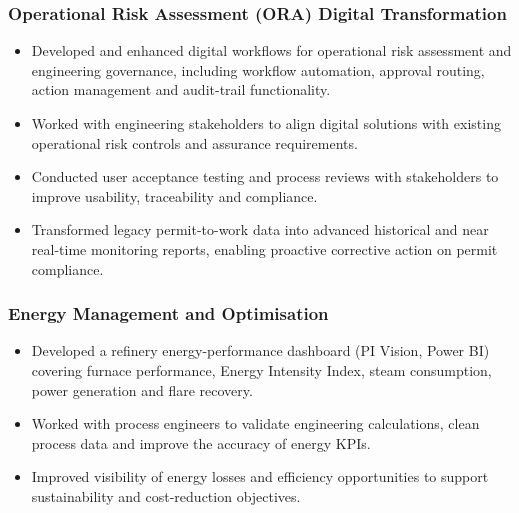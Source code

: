 \documentclass[11pt,a4paper]{article}
\begin{document}
\subsubsection*{Operational Risk Assessment (ORA) Digital Transformation}
\begin{itemize}
    \item Developed and enhanced digital workflows for operational risk
          assessment and engineering governance, including workflow
          automation, approval routing, action management and audit-trail
          functionality.
    \item Worked with engineering stakeholders to align digital solutions with
          existing operational risk controls and assurance requirements.
    \item Conducted user acceptance testing and process reviews with
          stakeholders to improve usability, traceability and compliance.
    \item Transformed legacy permit-to-work data into advanced historical and
          near real-time monitoring reports, enabling proactive corrective
          action on permit compliance.
\end{itemize}

\subsubsection*{Energy Management and Optimisation}
\begin{itemize}
    \item Developed a refinery energy-performance dashboard (PI Vision, Power
          BI) covering furnace performance, Energy Intensity Index, steam
          consumption, power generation and flare recovery.
    \item Worked with process engineers to validate engineering calculations,
          clean process data and improve the accuracy of energy KPIs.
    \item Improved visibility of energy losses and efficiency opportunities to
          support sustainability and cost-reduction objectives.
\end{itemize}
\end{document}

